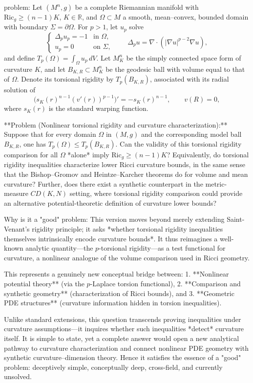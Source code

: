 problem:  
Let \((M^n,g)\) be a complete Riemannian manifold with \(\mathrm{Ric}_g \ge (n-1)K\), \(K\in\mathbb{R}\), and \(\Omega\subset M\) a smooth, mean–convex, bounded domain with boundary \(\Sigma = \partial \Omega\).  
For \(p>1\), let \(u_p\) solve  
\[
\begin{cases}
\Delta_p u_p = -1 &\text{in }\Omega,\\
u_p = 0 &\text{on }\Sigma,
\end{cases}
\qquad
\Delta_p u = \nabla\!\cdot(|\nabla u|^{p-2}\nabla u),
\]
and define \(T_p(\Omega)=\int_\Omega u_p\,dV\).  
Let \(M_K^n\) be the simply connected space form of curvature \(K\), and let \(B_{K,R}\subset M_K^n\) be the geodesic ball with volume equal to that of \(\Omega\). Denote its torsional rigidity by \(T_p(B_{K,R})\), associated with its radial solution of
\[
\big(s_K(r)^{n-1}(v'(r))^{p-1}\big)'=-s_K(r)^{n-1},\qquad v(R)=0,
\]
where \(s_K(r)\) is the standard warping function.

**Problem (Nonlinear torsional rigidity and curvature characterization):**  
Suppose that for every domain \(\Omega\) in \((M,g)\) and the corresponding model ball \(B_{K,R}\), one has \(T_p(\Omega)\le T_p(B_{K,R})\).  
Can the validity of this torsional rigidity comparison for all \(\Omega\) *alone* imply \(\mathrm{Ric}_g \ge (n-1)K\)?  
Equivalently, do torsional rigidity inequalities characterize lower Ricci curvature bounds, in the same sense that the Bishop–Gromov and Heintze–Karcher theorems do for volume and mean curvature?  
Further, does there exist a synthetic counterpart in the metric-measure \(CD(K,N)\) setting, where torsional rigidity comparison could provide an alternative potential-theoretic definition of curvature lower bounds?

Why is it a "good" problem:  
This version moves beyond merely extending Saint-Venant’s rigidity principle; it asks *whether torsional rigidity inequalities themselves intrinsically encode curvature bounds*.  
It thus reimagines a well-known analytic quantity—the \(p\)-torsional rigidity—as a test functional for curvature, a nonlinear analogue of the volume comparison used in Ricci geometry.  

This represents a genuinely new conceptual bridge between:  
1. **Nonlinear potential theory** (via the \(p\)-Laplace torsion functional),  
2. **Comparison and synthetic geometry** (characterization of Ricci bounds), and  
3. **Geometric PDE structures** (curvature information hidden in torsion inequalities).  

Unlike standard extensions, this question transcends proving inequalities under curvature assumptions—it inquires whether such inequalities *detect* curvature itself.  
It is simple to state, yet a complete answer would open a new analytical pathway to curvature characterization and connect nonlinear PDE geometry with synthetic curvature–dimension theory.  
Hence it satisfies the essence of a "good" problem: deceptively simple, conceptually deep, cross-field, and currently unsolved.